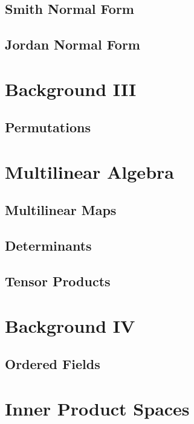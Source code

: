 \documentclass[article]{memoir}
\begin{document}
\newpage
\section{Smith Normal Form}

\newpage
\section{Jordan Normal Form}



\newpage
\chapter*{Background III}

\newpage
\section{Permutations}



\newpage
\chapter*{Multilinear Algebra}

\newpage
\section{Multilinear Maps}

\newpage
\section{Determinants}

\newpage
\section{Tensor Products}

\newpage
\chapter*{Background IV}

\newpage
\section{Ordered Fields}

\newpage
\chapter*{Inner Product Spaces}
\end{document}
